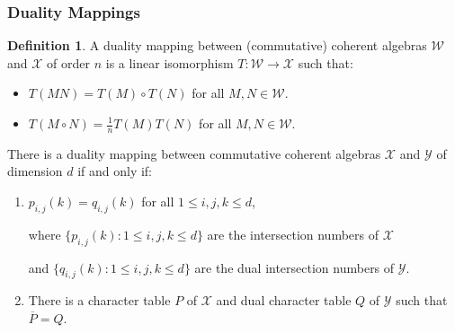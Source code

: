 \documentclass[notheorems]{beamer}
\theoremstyle{definition} %
\newtheorem{definition}{Definition}[section] %
\begin{document}
\begin{frame}

\frametitle{Duality Mappings}

	 {

		\begin{definition}
			A duality mapping between (commutative) coherent algebras $\mathcal{W}$ and $\mathcal{X}$ of order $n$ is a linear isomorphism $T : \mathcal{W} \to \mathcal{X}$ such that:

			\begin{itemize}
		  		\item $T(M N) = T(M) \circ T(N) $ for all $M, N \in \mathcal{W}$.
		  		\item $T (M \circ N) = \frac{1}{n} T(M) T(N)$ for all $M, N \in \mathcal{W}$.
			\end{itemize}

  		\end{definition}


	}

	 {

		There is a duality mapping between commutative coherent algebras $\mathcal{X}$ and $\mathcal{Y}$ of dimension $d$
		if and only if:
			\begin{enumerate}
				\item $p_{i,j}(k) = q_{i,j}(k)$ for all $1 \leq i,j,k \leq d$,

					\vspace{0.5em}

					where $\{ p_{i,j}(k) : 1 \leq i,j,k \leq d \}$ are the intersection numbers of $\mathcal{X}$ 

					\vspace{0.5em}

					and $\{ q_{i,j}(k) : 1 \leq i,j,k \leq d \}$ are the dual intersection numbers of $\mathcal{Y}$.

				\item There is a character table $P$ of $\mathcal{X}$ and dual character table $Q$ of $\mathcal{Y}$ such that $\overline{P} = Q$.
			\end{enumerate}

	}


\end{frame}
\end{document}

